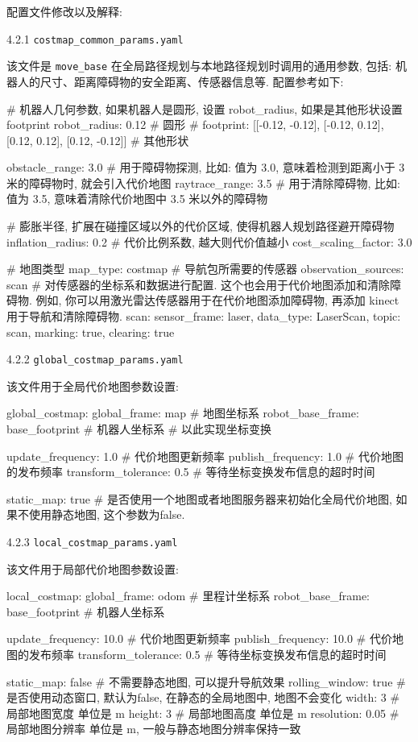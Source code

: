 \documentclass[openany, fontset=windowsold]{ctexbook}
\theoremstyle{kaiti}
\theoremstyle{normal}
\begin{document}
配置文件修改以及解释:

4.2.1 \verb|costmap_common_params.yaml|

该文件是 \verb|move_base| 在全局路径规划与本地路径规划时调用的通用参数, 包括: 机器人的尺寸、距离障碍物的安全距离、传感器信息等. 配置参考如下:

\begin{bash}
  # 机器人几何参数, 如果机器人是圆形, 设置 robot_radius, 如果是其他形状设置 footprint
  robot_radius: 0.12 # 圆形
  # footprint: [[-0.12, -0.12], [-0.12, 0.12], [0.12, 0.12], [0.12, -0.12]] # 其他形状

  obstacle_range: 3.0 # 用于障碍物探测, 比如: 值为 3.0, 意味着检测到距离小于 3 米的障碍物时, 就会引入代价地图
  raytrace_range: 3.5 # 用于清除障碍物, 比如: 值为 3.5, 意味着清除代价地图中 3.5 米以外的障碍物

  # 膨胀半径, 扩展在碰撞区域以外的代价区域, 使得机器人规划路径避开障碍物
  inflation_radius: 0.2
  # 代价比例系数, 越大则代价值越小
  cost_scaling_factor: 3.0

  # 地图类型
  map_type: costmap
  # 导航包所需要的传感器
  observation_sources: scan
  # 对传感器的坐标系和数据进行配置. 这个也会用于代价地图添加和清除障碍物. 例如, 你可以用激光雷达传感器用于在代价地图添加障碍物, 再添加 kinect 用于导航和清除障碍物.
  scan: {sensor_frame: laser, data_type: LaserScan, topic: scan, marking: true, clearing: true}
\end{bash}

4.2.2 \verb|global_costmap_params.yaml|

该文件用于全局代价地图参数设置:

\begin{bash}
  global_costmap:
    global_frame: map # 地图坐标系
    robot_base_frame: base_footprint # 机器人坐标系
    # 以此实现坐标变换

    update_frequency: 1.0 # 代价地图更新频率
    publish_frequency: 1.0 # 代价地图的发布频率
    transform_tolerance: 0.5 # 等待坐标变换发布信息的超时时间

    static_map: true # 是否使用一个地图或者地图服务器来初始化全局代价地图, 如果不使用静态地图, 这个参数为false.
\end{bash}

4.2.3 \verb|local_costmap_params.yaml|

该文件用于局部代价地图参数设置:

\begin{bash}
  local_costmap:
    global_frame: odom # 里程计坐标系
    robot_base_frame: base_footprint # 机器人坐标系

    update_frequency: 10.0 # 代价地图更新频率
    publish_frequency: 10.0 # 代价地图的发布频率
    transform_tolerance: 0.5 # 等待坐标变换发布信息的超时时间

    static_map: false  # 不需要静态地图, 可以提升导航效果
    rolling_window: true # 是否使用动态窗口, 默认为false, 在静态的全局地图中, 地图不会变化
    width: 3 # 局部地图宽度 单位是 m
    height: 3 # 局部地图高度 单位是 m
    resolution: 0.05 # 局部地图分辨率 单位是 m, 一般与静态地图分辨率保持一致
\end{bash}
\end{document}
